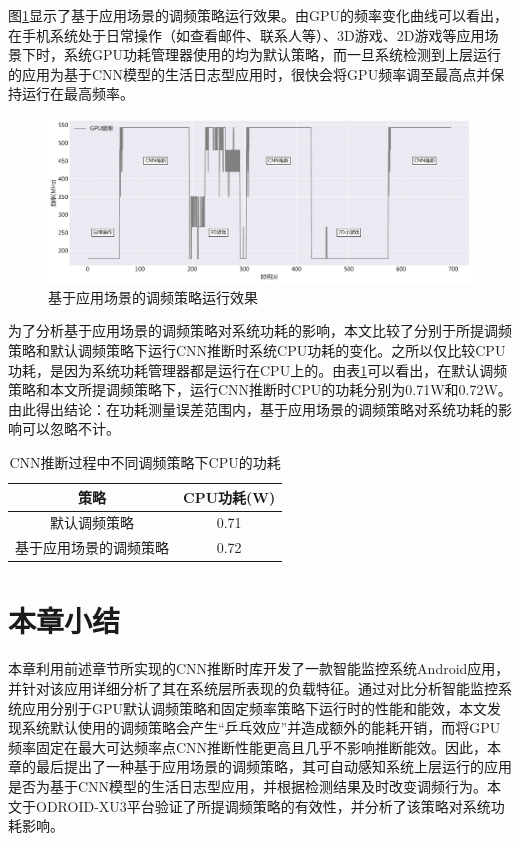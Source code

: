 图\ref{figure:figure42}显示了基于应用场景的调频策略运行效果。由GPU的频率变化曲线可以看出，在手机系统处于日常操作（如查看邮件、联系人等）、3D游戏、2D游戏等应用场景下时，系统GPU功耗管理器使用的均为默认策略，而一旦系统检测到上层运行的应用为基于CNN模型的生活日志型应用时，很快会将GPU频率调至最高点并保持运行在最高频率。

\begin{figure}[htbp]
    \centering
    \includegraphics[width=1.0\textwidth]{figures/system_governor.pdf}
    \caption{基于应用场景的调频策略运行效果}\label{figure:figure42}
\end{figure}

为了分析基于应用场景的调频策略对系统功耗的影响，本文比较了分别于所提调频策略和默认调频策略下运行CNN推断时系统CPU功耗的变化。之所以仅比较CPU功耗，是因为系统功耗管理器都是运行在CPU上的。由表\ref{table:table12}可以看出，在默认调频策略和本文所提调频策略下，运行CNN推断时CPU的功耗分别为0.71W和0.72W。由此得出结论：在功耗测量误差范围内，基于应用场景的调频策略对系统功耗的影响可以忽略不计。

\begin{table}[htbp]
  \centering
  \caption{CNN推断过程中不同调频策略下CPU的功耗}
  \label{table:table12}
  \begin{tabular}{cc}
    \toprule
      策略 & CPU功耗(W) \\
    \midrule
      默认调频策略 & 0.71 \\
      基于应用场景的调频策略 & 0.72 \\
    \bottomrule
  \end{tabular}
\end{table}

\section{本章小结}
本章利用前述章节所实现的CNN推断时库开发了一款智能监控系统Android应用，并针对该应用详细分析了其在系统层所表现的负载特征。通过对比分析智能监控系统应用分别于GPU默认调频策略和固定频率策略下运行时的性能和能效，本文发现系统默认使用的调频策略会产生“乒乓效应”并造成额外的能耗开销，而将GPU频率固定在最大可达频率点CNN推断性能更高且几乎不影响推断能效。因此，本章的最后提出了一种基于应用场景的调频策略，其可自动感知系统上层运行的应用是否为基于CNN模型的生活日志型应用，并根据检测结果及时改变调频行为。本文于ODROID-XU3平台验证了所提调频策略的有效性，并分析了该策略对系统功耗影响。

\cleardoublepage 